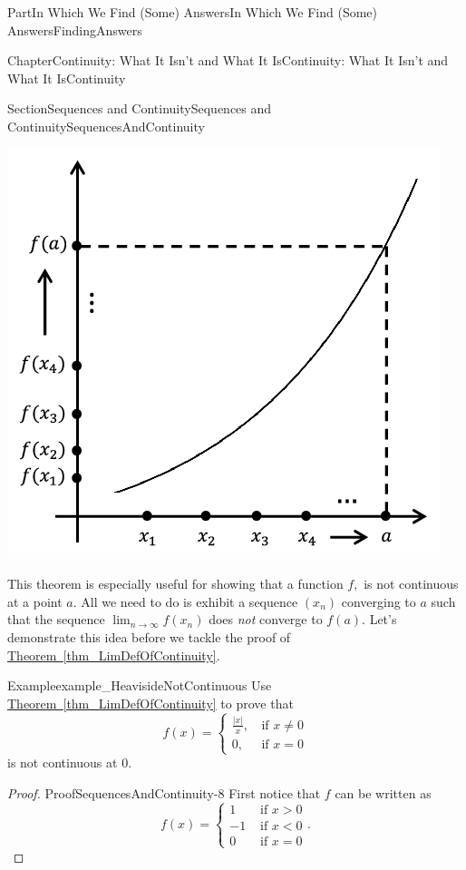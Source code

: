 \documentclass[oneside,10pt,]{book}
\newcommand{\xreffont}{\relax}
\numberwithin{equation}{part}
\def\limit#1#2#3{{\displaystyle\lim_{#1\rightarrow #2}#3}}
\newcommand{\lt}{<}
\newcommand{\amp}{&}
\begin{document}
\begin{partptx}{Part}{In Which We Find (Some) Answers}{}{In Which We Find (Some) Answers}{}{}{FindingAnswers}
\begin{chapterptx}{Chapter}{Continuity: What It Isn't and What It Is}{}{Continuity: What It Isn't and What It Is}{}{}{Continuity}
\begin{sectionptx}{Section}{Sequences and Continuity}{}{Sequences and Continuity}{}{}{SequencesAndContinuity}
\begin{image}{0.315}{0.37}{0.315}{}
\includegraphics[width=\linewidth]{external/images/Ch5fig6.png}
\end{image}%
This theorem is especially useful for showing that a function \(f,\) is not continuous at a point \(a\). All we need to do is exhibit a sequence \(\left(x_n\right)\) converging to \(a\) such that the sequence \(\limit{n}{\infty}{f(x_n)}\) does \emph{not} converge to \(f(a)\).  Let's demonstrate this idea before we tackle the proof of \hyperref[thm_LimDefOfContinuity]{Theorem~{\xreffont\ref{thm_LimDefOfContinuity}}}.%
\begin{example}{Example}{}{example_HeavisideNotContinuous}%
Use \hyperref[thm_LimDefOfContinuity]{Theorem~{\xreffont\ref{thm_LimDefOfContinuity}}} to prove that%
\begin{equation*}
f(x)= \begin{cases}\frac{|x|}{x}\text{,} \amp \text{ if } x\neq 0\\ 0\text{,} \amp \text{ if } x=0 \end{cases}
\end{equation*}
is not continuous at \(0\).%
\end{example}
\begin{proof}{Proof}{}{SequencesAndContinuity-8}
First notice that \(f\) can be written as%
\begin{equation*}
f(x)= \begin{cases}1\amp \text{ if } x>0\\ -1\amp \text{ if } x\lt 0\\ 0\amp \text{ if } x=0 \end{cases} \text{.}

\end{equation*}
\end{proof}
\end{sectionptx}
\end{chapterptx}
\end{partptx}
\end{document}
